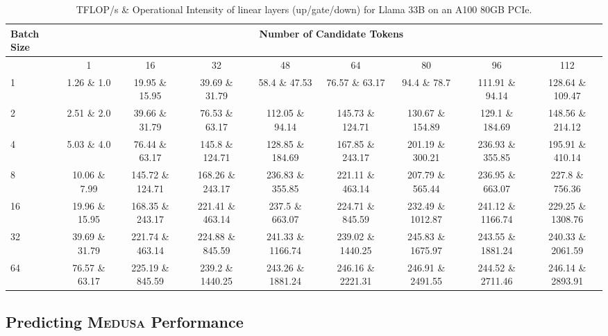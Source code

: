 \documentclass{article}
\theoremstyle{plain}
\theoremstyle{definition}
\theoremstyle{remark}
\newcommand{\ours}
{\textsc{Medusa}\xspace}
\begin{document}
\begin{table}[h]
\centering
\tiny
\begin{tabular}{lcccccccc}
\toprule
Batch Size & \multicolumn{8}{c}{Number of Candidate Tokens} \\
\midrule
 & 1 & 16 & 32 & 48 & 64 & 80 & 96 & 112 \\
\midrule
1  & 1.26 \& 1.0 & 19.95 \& 15.95 & 39.69 \& 31.79 & 58.4 \& 47.53 & 76.57 \& 63.17 & 94.4 \& 78.7 & 111.91 \& 94.14 & 128.64 \& 109.47 \\
2  & 2.51 \& 2.0 & 39.66 \& 31.79 & 76.53 \& 63.17 & 112.05 \& 94.14 & 145.73 \& 124.71 & 130.67 \& 154.89 & 129.1 \& 184.69 & 148.56 \& 214.12 \\
4  & 5.03 \& 4.0 & 76.44 \& 63.17 & 145.8 \& 124.71 & 128.85 \& 184.69 & 167.85 \& 243.17 & 201.19 \& 300.21 & 236.93 \& 355.85 & 195.91 \& 410.14 \\
8  & 10.06 \& 7.99 & 145.72 \& 124.71 & 168.26 \& 243.17 & 236.83 \& 355.85 & 221.11 \& 463.14 & 207.79 \& 565.44 & 236.95 \& 663.07 & 227.8 \& 756.36 \\
16 & 19.96 \& 15.95 & 168.35 \& 243.17 & 221.41 \& 463.14 & 237.5 \& 663.07 & 224.71 \& 845.59 & 232.49 \& 1012.87 & 241.12 \& 1166.74 & 229.25 \& 1308.76 \\
32 & 39.69 \& 31.79 & 221.74 \& 463.14 & 224.88 \& 845.59 & 241.33 \& 1166.74 & 239.02 \& 1440.25 & 245.83 \& 1675.97 & 243.55 \& 1881.24 & 240.33 \& 2061.59 \\
64 & 76.57 \& 63.17 & 225.19 \& 845.59 & 239.2 \& 1440.25 & 243.26 \& 1881.24 & 246.16 \& 2221.31 & 246.91 \& 2491.55 & 244.52 \& 2711.46 & 246.14 \& 2893.91 \\
\bottomrule
\end{tabular}
\caption{
TFLOP/s \& Operational Intensity of linear layers (up/gate/down) for Llama 33B on an A100 80GB PCIe.
}\label{tab:llama33b-spec--mlp-bsall}
\end{table}

\subsection{Predicting \ours Performance}
\end{document}
